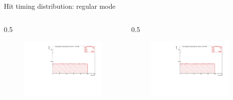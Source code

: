 \documentclass{beamer}
\begin{document}
\begin{frame}{Hit timing distribution: regular mode}
\vspace{-10mm}
\begin{columns}
    \begin{column}{0.5\framewidth}
        \begin{figure}[H]
          \centering
          \hspace*{-2em}
        \includegraphics[width=1.2\columnwidth]{figures/pdf/figure_00001_timedistr_roc_simulation_10538.pdf}
          \label{fig:enter-label} 
          \end{figure}
    \end{column}
    \begin{column}{0.5\framewidth}
        \begin{figure}[H]
          \centering
                    \hspace*{-1em}
        \includegraphics[width=1.2\columnwidth]{figures/pdf/figure_00012_timedistr_roc_simulation_ch2_105038.pdf}

\end{figure}
\end{column}
\end{columns}
\end{frame}
\end{document}
